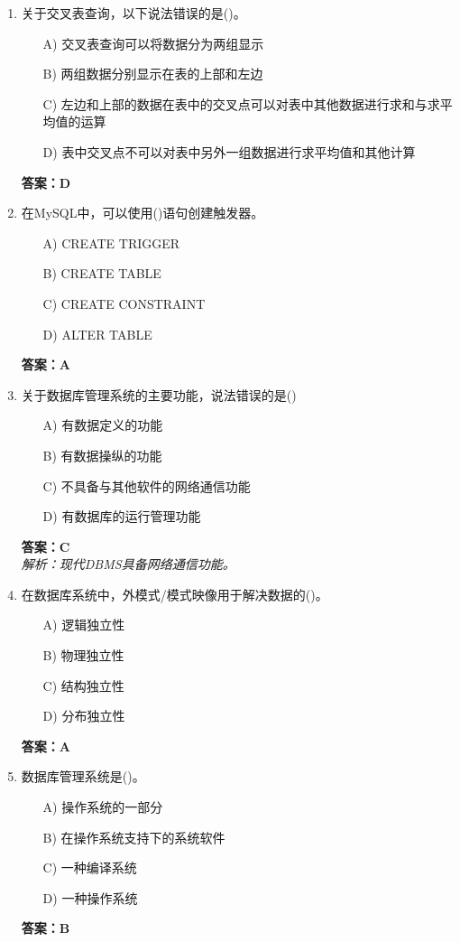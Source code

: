 \documentclass[a4paper,12pt]{article}
\begin{document}
\begin{enumerate}[label=\arabic*.]
\item 关于交叉表查询，以下说法错误的是()。
\begin{itemize}
    \item[A)] 交叉表查询可以将数据分为两组显示
    \item[B)] 两组数据分别显示在表的上部和左边
    \item[C)] 左边和上部的数据在表中的交叉点可以对表中其他数据进行求和与求平均值的运算
    \item[D)] 表中交叉点不可以对表中另外一组数据进行求平均值和其他计算
\end{itemize}
\textbf{答案：D}

\item 在MySQL中，可以使用()语句创建触发器。
\begin{itemize}
    \item[A)] CREATE TRIGGER
    \item[B)] CREATE TABLE
    \item[C)] CREATE CONSTRAINT
    \item[D)] ALTER TABLE
\end{itemize}
\textbf{答案：A}

\item 关于数据库管理系统的主要功能，说法错误的是()
\begin{itemize}
    \item[A)] 有数据定义的功能
    \item[B)] 有数据操纵的功能
    \item[C)] 不具备与其他软件的网络通信功能
    \item[D)] 有数据库的运行管理功能
\end{itemize}
\textbf{答案：C} \\
\textit{解析：现代DBMS具备网络通信功能。}

\item 在数据库系统中，外模式/模式映像用于解决数据的()。
\begin{itemize}
    \item[A)] 逻辑独立性
    \item[B)] 物理独立性
    \item[C)] 结构独立性
    \item[D)] 分布独立性
\end{itemize}
\textbf{答案：A}

\item 数据库管理系统是()。
\begin{itemize}
    \item[A)] 操作系统的一部分
    \item[B)] 在操作系统支持下的系统软件
    \item[C)] 一种编译系统
    \item[D)] 一种操作系统
\end{itemize}
\textbf{答案：B}


\end{enumerate}
\end{document}
